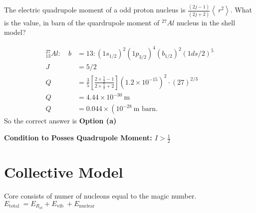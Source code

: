 \begin{exercise}
	The electric quadrupole moment of a odd proton nucleus is $\frac{(2 j-1)}{(2 j+2)}\left\langle\ r^{2}\right\rangle$. What is the value, in barn of the quardrupole moment of ${}^{27}Al$ nucleus in the shell model?
\end{exercise}
\begin{answer}
	\begin{align*}
	{ }_{13}^{27} A l: \quad b&=13:\left(1 s_{1 / 2}\right)^{2}\left(1 p_{3 / 2}\right)^{4}\left(b_{1 / 2}\right)^{2}(1 d s / 2)^{5}\\
	J&=5 / 2\\
	Q&=\frac{3}{5}\left[\frac{2 \times \frac{5}{2}-1}{2 \times \frac{5}{2}+2}\right]\left(1.2 \times 10^{-15}\right)^{2} \cdot(27)^{2 / 3}\\
	Q&=4.44 \times 10^{-30} \mathrm{~m}\\
	Q&=0.044 \times\left(10^{-28} \mathrm{~m}\right. \text { barn. }
	\end{align*}
	So the correct answer is \textbf{Option (a)}
\end{answer}
\textbf{Condition to Posses Quadrupole Moment: $I>\frac{1}{2}$}
\section{Collective Model}
Core consists of numer of nucleons equal to the magic number.\\
$E_{\text {total }}=E_{R_{o t}}+E_{\text {vib }}+E_{\text {nuclear }}$\\

